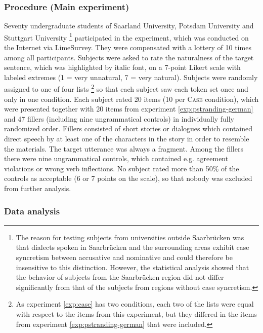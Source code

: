 \subsubsection{Procedure (Main experiment)}
\label{sec:fragments-case-rating-method}
Seventy undergraduate students of Saarland University, Potsdam University and Stutt\-gart University%
%
\footnote{The reason for testing subjects from universities outside Saarbrücken was that dialects spoken in Saarbrücken and the surrounding areas exhibit case syncretism between accusative and nominative and could therefore be insensitive to this distinction. However, the statistical analysis showed that the behavior of subjects from the Saarbrücken region did not differ significantly from that of the subjects from regions without case syncretism.}\afterfn%
% 
participated in the experiment, which was conducted on the Internet via LimeSurvey. They were compensated with a lottery of 10 times  among all participants. Subjects were asked to rate the naturalness of the target sentence, which was highlighted by italic font, on a 7-point Likert scale with labeled extremes (1 = very unnatural, 7 = very natural). Subjects were randomly assigned to one of four lists%
%
\footnote{As experiment \ref{exp:case} has two conditions, each two of the lists were equal with respect to the items from this experiment, but they differed in the items from experiment \ref{exp:pstranding-german} that were included.}\afterfn%
%
so that each subject saw each token set once and only in one condition. Each subject rated 20 items (10 per \textsc{Case} condition), which were presented together with 20 items from experiment \ref{exp:pstranding-german} and 47 fillers (including nine ungrammatical controls) in individually fully randomized order.  Fillers consisted of short stories or dialogues which contained direct speech by at least one of the characters in the story in order to resemble the materials. The target utterance was always a fragment. Among the fillers there were nine ungrammatical controls, which contained e.g. agreement violations or wrong verb inflections. No subject rated more than 50\% of the controls as acceptable (6 or 7 points on the scale), so that nobody was excluded from further analysis.

\subsubsection{Data analysis}
\label{sec:intro-stats}

